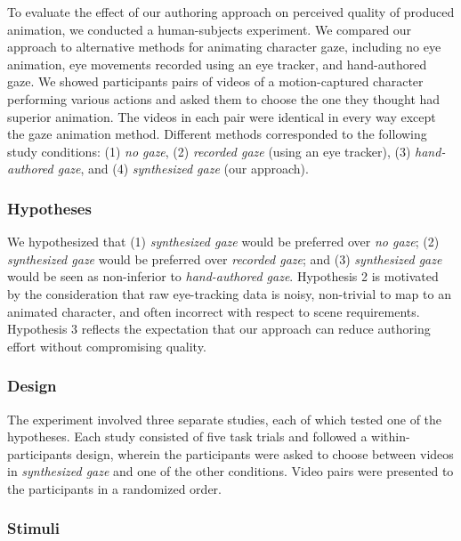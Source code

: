 To evaluate the effect of our authoring approach on perceived quality of produced animation, we conducted a human-subjects experiment. We compared our approach to alternative methods for animating character gaze, including no eye animation, eye movements recorded using an eye tracker, and hand-authored gaze. We showed participants pairs of videos of a motion-captured character performing various actions and asked them to choose the one they thought had superior animation. The videos in each pair were identical in every way except the gaze animation method. Different methods corresponded to the following study conditions: (1) \emph{no gaze}, (2) \emph{recorded gaze} (using an eye tracker), (3) \emph{hand-authored gaze}, and (4) \emph{synthesized gaze} (our approach).

\subsubsection{Hypotheses}

We hypothesized that (1) \emph{synthesized gaze} would be preferred over \emph{no gaze}; (2) \emph{synthesized gaze} would be preferred over \emph{recorded gaze}; and (3) \emph{synthesized gaze} would be seen as non-inferior to \emph{hand-authored gaze}.
Hypothesis 2 is motivated by the consideration that raw eye-tracking data is noisy, non-trivial to map to an animated character, and often incorrect with respect to scene requirements. Hypothesis 3 reflects the expectation that our approach can reduce authoring effort without compromising quality.

\subsubsection{Design}

The experiment involved three separate studies, each of which tested one of the hypotheses. Each study consisted of five task trials and followed a within-participants design, wherein the participants were asked to choose between videos in \emph{synthesized gaze} and one of the other conditions. Video pairs were presented to the participants in a randomized order.

\subsubsection{Stimuli}

